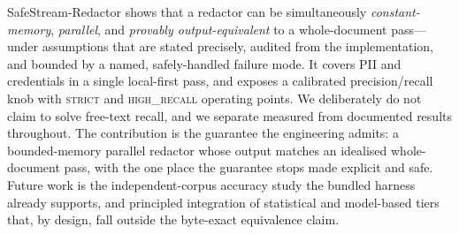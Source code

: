 \documentclass[runningheads]{llncs}
\begin{document}
SafeStream-Redactor shows that a redactor can be simultaneously
\emph{constant-memory}, \emph{parallel}, and \emph{provably output-equivalent} to
a whole-document pass---under assumptions that are stated precisely, audited from
the implementation, and bounded by a named, safely-handled failure mode. It
covers PII and credentials in a single local-first pass, and exposes a calibrated
precision/recall knob with \textsc{strict} and \textsc{high\_recall} operating
points. We deliberately do not claim to solve free-text recall, and we separate
measured from documented results throughout. The contribution is the guarantee
the engineering admits: a bounded-memory parallel redactor whose output matches
an idealised whole-document pass, with the one place the guarantee stops made
explicit and safe. Future work is the independent-corpus accuracy study the
bundled harness already supports, and principled integration of statistical and
model-based tiers that, by design, fall outside the byte-exact equivalence claim.
\end{document}
